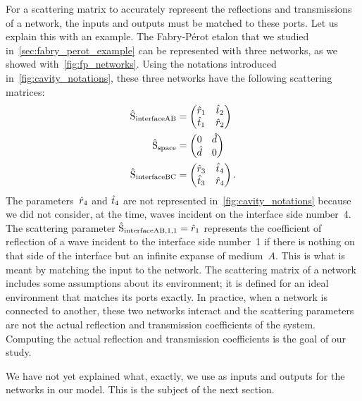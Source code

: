 For a scattering matrix to accurately represent the reflections and transmissions of a network, the inputs and outputs must be matched to these ports.
Let us explain this with an example.
The Fabry-Pérot etalon that we studied in~\cref{sec:fabry_perot_example} can be represented with three networks, as we showed with~\cref{fig:fp_networks}.
Using the notations introduced in~\vref{fig:cavity_notations},
these three networks have the following scattering matrices:
\begin{align}
    \hat{\mathrm{S}}_\text{interfaceAB}
    &=
    \begin{pmatrix}
        \hat{r}_1 & \hat{t}_2 \\
        \hat{t}_1 & \hat{r}_2
    \end{pmatrix}
    \\
    \hat{\mathrm{S}}_\text{space}
    &=
    \begin{pmatrix}
        0      & \hat{d} \\
        \hat{d} & 0
    \end{pmatrix}
    \\
    \hat{\mathrm{S}}_\text{interfaceBC}
    &=
    \begin{pmatrix}
        \hat{r}_3 & \hat{t}_4 \\
        \hat{t}_3 & \hat{r}_4
    \end{pmatrix}
    \text{.}
\end{align}
The parameters~$\hat{r}_4$ and $\hat{t}_4$ are not represented in~\cref{fig:cavity_notations}
because we did not consider, at the time, waves incident on the interface side number~4.
The scattering parameter $\hat{\mathrm{S}}_\text{interfaceAB,1,1} = \hat{r}_1$ represents the coefficient of reflection of a wave incident to the interface side number~1 if there is nothing on that side of the interface but an infinite expanse of medium~$A$.
This is what is meant by matching the input to the network.
The scattering matrix of a network includes some assumptions about its environment;
it is defined for an ideal environment that matches its ports exactly.
In practice, when a network is connected to another, these two networks interact and the scattering parameters are not the actual reflection and transmission coefficients of the system.
Computing the actual reflection and transmission coefficients is the goal of our study.

We have not yet explained what, exactly, we use as inputs and outputs for the networks in our model.
This is the subject of the next section.




